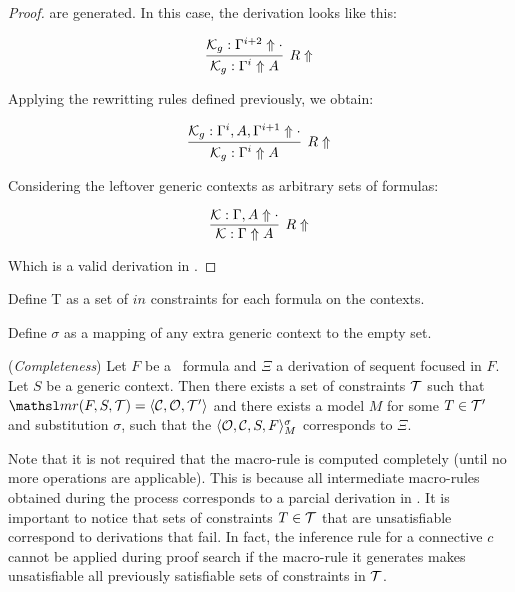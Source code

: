 \begin{proof}
are generated. In this case, the derivation looks like this:

$$
\infer[R\Uparrow]{\genK : \Gamma^{i} \Uparrow A}{\genK :
\Gamma^{i+2} \Uparrow \cdot}
$$

Applying the rewritting rules defined previously, we obtain:

$$
\infer[R\Uparrow]{\genK : \Gamma^{i} \Uparrow A}{\genK :
\Gamma^{i}, A, \Gamma^{i+1} \Uparrow \cdot}
$$

Considering the leftover generic contexts as arbitrary sets of formulas:

$$
\infer[R\Uparrow]{\mathcal{K} : \Gamma \Uparrow A}{\mathcal{K} :
\Gamma, A \Uparrow \cdot}
$$

Which is a valid derivation in \sellf.
\end{proof}

\begin{comment}
1) Metodo (K): 
   model ---> tree
2) Metodo
   root sequent e formula --> set of set of constraints
             
{ K(M) | forall C in T. forall M. T |= M} = { set of derivations in SELLF introducing Root sequent}
\end{comment}

\begin{giselle}
Define T as a set of $in$ constraints for each formula on the contexts.

Define $\sigma$ as a mapping of any extra generic context to the empty set. 
\end{giselle}

\begin{theorem}
\label{thm:completeness}
(\textit{Completeness})
Let $F$ be a \sellf\ formula and $\Xi$ a derivation of sequent focused in $F$. 
Let $S$ be a generic context. Then there exists a set of constraints $\mathcal{T}$ such that
$\mr{F}{S}{\Tscr} = \langle \Cscr, \Oscr, \Tscr' \rangle$ and there exists a
model $M$ for some $T \in \mathcal{T}'$ and substitution $\sigma$, such that the $\langle \mathcal{O},
\mathcal{C}, S, F \rangle_M^{\sigma}$ corresponds to $\Xi$. 
\end{theorem}



Note that it is not required that the macro-rule is computed completely (until
no more operations are applicable). This is because all intermediate macro-rules
obtained during the process corresponds to a parcial derivation in \sellf. It is
important to notice that sets of constraints $T \in \mathcal{T}$ that are
unsatisfiable correspond to derivations that fail. In fact, the inference rule
for a connective $c$ cannot be applied during proof search if the macro-rule it
generates makes unsatisfiable all previously satisfiable sets of constraints in
$\mathcal{T}$.
